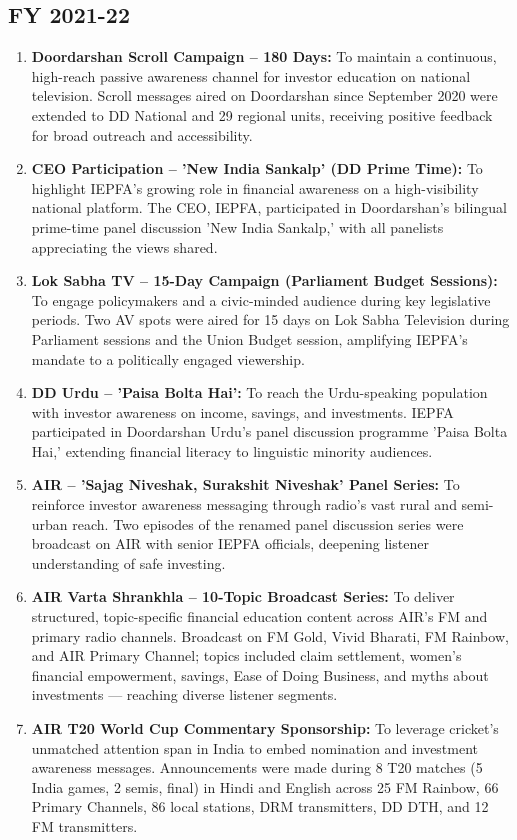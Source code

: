 \documentclass[openany]{book}
\begin{document}
\subsection{FY 2021-22}
\begin{enumerate}
    \item \textbf{Doordarshan Scroll Campaign – 180 Days:} To maintain a continuous, high-reach passive awareness channel for investor education on national television. Scroll messages aired on Doordarshan since September 2020 were extended to DD National and 29 regional units, receiving positive feedback for broad outreach and accessibility.
    \item \textbf{CEO Participation – 'New India Sankalp' (DD Prime Time):} To highlight IEPFA's growing role in financial awareness on a high-visibility national platform. The CEO, IEPFA, participated in Doordarshan's bilingual prime-time panel discussion 'New India Sankalp,' with all panelists appreciating the views shared.
    \item \textbf{Lok Sabha TV – 15-Day Campaign (Parliament Budget Sessions):} To engage policymakers and a civic-minded audience during key legislative periods. Two AV spots were aired for 15 days on Lok Sabha Television during Parliament sessions and the Union Budget session, amplifying IEPFA's mandate to a politically engaged viewership.
    \item \textbf{DD Urdu – 'Paisa Bolta Hai':} To reach the Urdu-speaking population with investor awareness on income, savings, and investments. IEPFA participated in Doordarshan Urdu's panel discussion programme 'Paisa Bolta Hai,' extending financial literacy to linguistic minority audiences.
    \item \textbf{AIR – 'Sajag Niveshak, Surakshit Niveshak' Panel Series:} To reinforce investor awareness messaging through radio's vast rural and semi-urban reach. Two episodes of the renamed panel discussion series were broadcast on AIR with senior IEPFA officials, deepening listener understanding of safe investing.
    \item \textbf{AIR Varta Shrankhla – 10-Topic Broadcast Series:} To deliver structured, topic-specific financial education content across AIR's FM and primary radio channels. Broadcast on FM Gold, Vivid Bharati, FM Rainbow, and AIR Primary Channel; topics included claim settlement, women's financial empowerment, savings, Ease of Doing Business, and myths about investments — reaching diverse listener segments.
    \item \textbf{AIR T20 World Cup Commentary Sponsorship:} To leverage cricket's unmatched attention span in India to embed nomination and investment awareness messages. Announcements were made during 8 T20 matches (5 India games, 2 semis, final) in Hindi and English across 25 FM Rainbow, 66 Primary Channels, 86 local stations, DRM transmitters, DD DTH, and 12 FM transmitters.

\end{enumerate}
\end{document}
